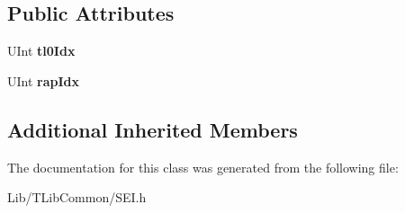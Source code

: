 \subsection*{Public Attributes}
\begin{DoxyCompactItemize}
\item 
\mbox{\label{class_s_e_i_temporal_level0_index_a9d5ef2110321b4d2ffbedd1922440971}} 
U\+Int {\bfseries tl0\+Idx}
\item 
\mbox{\label{class_s_e_i_temporal_level0_index_a089da3bced00a20d24abe42070e5fb88}} 
U\+Int {\bfseries rap\+Idx}
\end{DoxyCompactItemize}
\subsection*{Additional Inherited Members}


The documentation for this class was generated from the following file\+:\begin{DoxyCompactItemize}
\item 
Lib/\+T\+Lib\+Common/S\+E\+I.\+h\end{DoxyCompactItemize}
